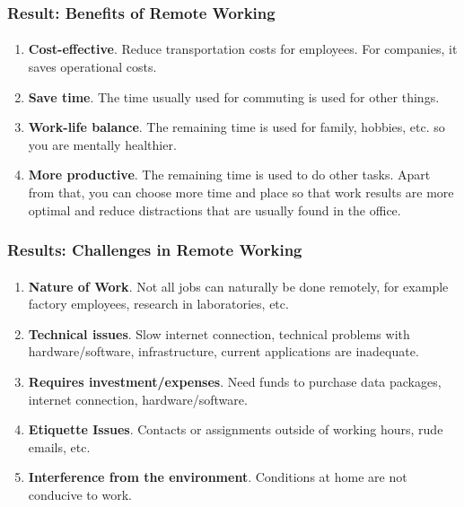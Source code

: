 \documentclass[aspectratio=169, table]{beamer}
\begin{document}
    \begin{frame}
        \frametitle{Result: Benefits of Remote Working}
        \framesubtitle{\hspace{1cm}}
        \begin{enumerate}
            \item \textbf{Cost-effective}. Reduce transportation costs for employees. For companies, it saves operational costs.
            \item \textbf{Save time}. The time usually used for commuting is used for other things.
            \item \textbf{Work-life balance}. The remaining time is used for family, hobbies, etc. so you are mentally healthier.
            \item \textbf{More productive}. The remaining time is used to do other tasks. Apart from that, you can choose more time and place so that work results are more optimal and reduce distractions that are usually found in the office.
        \end{enumerate}
    \end{frame}

    \begin{frame}
        \frametitle{Results: Challenges in Remote Working}
        \framesubtitle{\hspace{1cm}}
        \begin{enumerate}
            \item \textbf{Nature of Work}. Not all jobs can naturally be done remotely, for example factory employees, research in laboratories, etc.
            \item \textbf{Technical issues}. Slow internet connection, technical problems with hardware/software, infrastructure, current applications are inadequate.
            \item \textbf{Requires investment/expenses}. Need funds to purchase data packages, internet connection, hardware/software.
            \item \textbf{Etiquette Issues}. Contacts or assignments outside of working hours, rude emails, etc.
            \item \textbf{Interference from the environment}. Conditions at home are not conducive to work.

        \end{enumerate}
    \end{frame}
\end{document}
